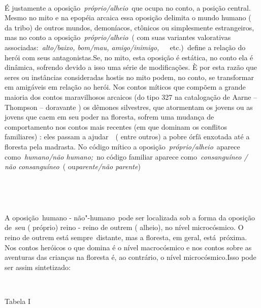 ~

É justamente a oposição~\emph{próprio/alheio}~que ocupa no conto, a
posição central. Mesmo no mito e na epopéia arcaica essa oposição
delimita o mundo humano ( da tribo) de outros mundos, demoníacos,
ctônicos ou simplesmente estrangeiros, mas no conto a
oposição~\emph{próprio/alheio}~( com suas variantes valorativas
associadas:~\emph{alto/baixo, bom/mau,
amigo/inimigo,~~}~etc.)\emph{~}define a relação do herói com seus
antagonistas.Se, no mito, esta oposição é estática, no conto ela é
dinâmica, sofrendo devido a isso uma série de modificações. È por esta
razão que seres ou instâncias consideradas hostis no mito podem, no
conto, se transformar em amigáveis em relação ao herói. Nos contos
míticos que compõem a grande maioria dos contos maravilhosos arcaicos
(do tipo 327 na catalogação de Aarne --Thompson -- doravante ) os
dêmones silvestres, que atormentam os jovens ou as jovens que caem em
seu poder na floresta, sofrem uma mudança de comportamento nos contos
mais recentes (em que dominam os conflitos familiares) : eles passam a
ajudar~~( entre outros) a pobre órfã enxotada até a floresta pela
madrasta. No código mítico a oposição~\emph{próprio/alheio}~aparece
como~\emph{humano/não humano;~}no código familiar aparece
como~\emph{consanguíneo / não consanguíneo~}( ou\emph{parente/não
parente})

~

~

A oposição~{humano - não"-humano}~pode ser localizada sob a forma da
oposição de~{seu ( próprio) reino - reino de outrem ( alheio)}, no nível
microcósmico. O reino de outrem está sempre~{distante}, mas a floresta,
em geral, está~{próxima}. Nos contos heróicos o que domina é o nível
macrocósmico e nos contos sobre as aventuras das crianças na floresta é,
ao contrário, o nível microcósmico.Isso pode ser assim sintetizado:

~

Tabela I

%
%
%
%
~

